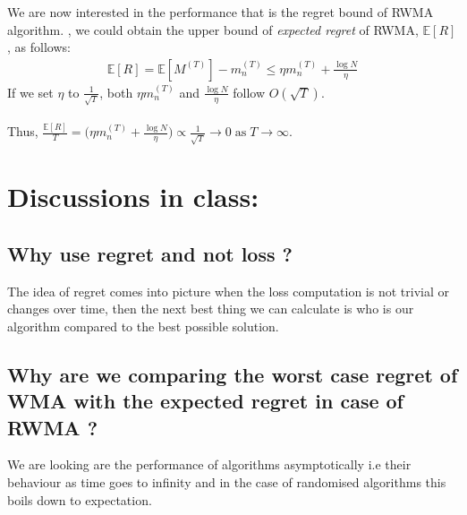 \documentclass[11pt]{article}
\begin{document}
We are now interested in the performance that is the regret bound of RWMA algorithm.
, we could obtain the upper bound of \textit{expected regret} of RWMA, $\mathbb{E}[R]$, as follows:
\begin{align}
    \mathbb{E}[R] = \mathbb{E}[M^{(T)}] - m_n^{(T)} \leq \eta m_n^{(T)} + \frac{\log N}{\eta} \label{eq:rwma_final}
\end{align}
If we set $\eta$ to $\frac{1}{\sqrt{T}}$, both $\eta m_n^{(T)}$ and $\frac{\log N}{\eta}$ follow $O(\sqrt{T})$.\\\\
Thus, $\frac{\mathbb{E}[R]}{T} = \Big(\eta m_n^{(T)} + \frac{\log N}{\eta}\Big) \propto \frac{1}{\sqrt{T}}\rightarrow 0\;\text{as}\;T\rightarrow\infty$.

\section{Discussions in class:}
\subsection{Why use regret and not loss ?}
The idea of regret comes into picture when the loss computation is not trivial or changes over time, then the next best thing we can calculate is who is our algorithm compared to the best possible solution.
\subsection{Why are we comparing the worst case regret of WMA with the expected regret in case of RWMA ?}
We are looking are the performance of algorithms asymptotically i.e their behaviour as time goes to infinity and in the case of randomised algorithms this boils down to expectation.


{


}




\appendix
\end{document}
